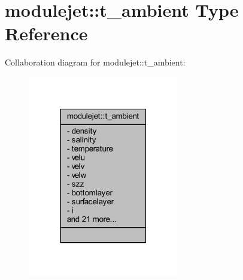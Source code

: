 \hypertarget{structmodulejet_1_1t__ambient}{}\section{modulejet\+:\+:t\+\_\+ambient Type Reference}
\label{structmodulejet_1_1t__ambient}


Collaboration diagram for modulejet\+:\+:t\+\_\+ambient\+:\nopagebreak
\begin{figure}[H]
\begin{center}
\leavevmode
\includegraphics[width=187pt]{structmodulejet_1_1t__ambient__coll__graph}
\end{center}
\end{figure}
